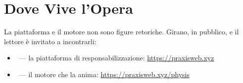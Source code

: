 \section*{Dove Vive l'Opera}

La piattaforma e il motore non sono figure retoriche. Girano, in pubblico, e il
lettore \`e invitato a incontrarli:

\begin{itemize}
\item \praxis\ --- la piattaforma di responsabilizzazione: \url{https://praxisweb.xyz}
\item \physis\ --- il motore che la anima: \url{https://praxisweb.xyz/physis}
\end{itemize}
